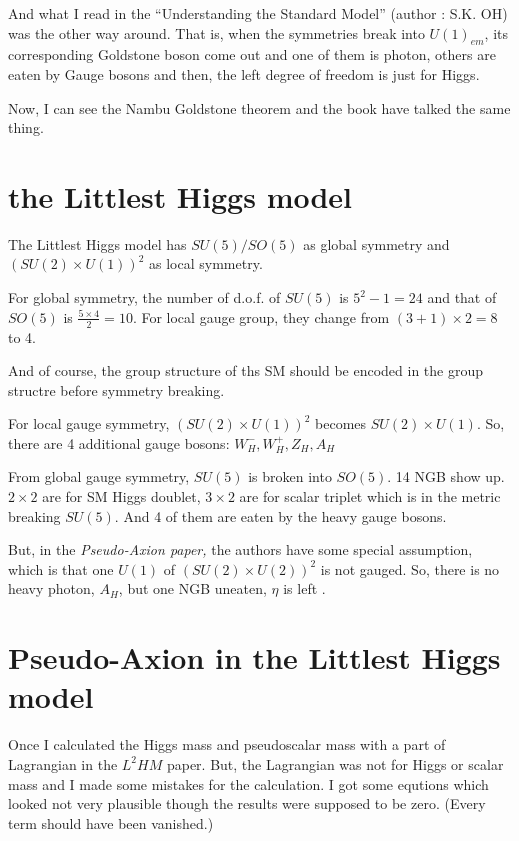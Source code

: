 \documentclass[aps,preprint,floatfix,nofootinbib,showpacs]{revtex4-1}
\begin{document}
And what I read in the ``Understanding the Standard Model'' 
(author : S.K. OH) was the other way around.
That is, when the symmetries break into $U(1)_{em}$, 
its corresponding Goldstone boson come out and 
one of them is photon, others are eaten by Gauge bosons and then, 
the left degree of freedom is just for Higgs.

Now, I can see the Nambu Goldstone theorem and the book have talked the same thing.




\newpage
\section{the Littlest Higgs model}
The Littlest Higgs model has $SU(5)/SO(5)$ as global symmetry and $(SU(2)\times U(1))^2$ 
as local symmetry.

For global symmetry, the number of d.o.f. of $SU(5)$ is $5^2 -1 = 24$ and 
that of $SO(5)$ is $\frac{5\times4}{2} = 10$. 
For local gauge group, they change from $(3+1)\times 2 = 8$ to 4. 

And of course, the group structure of ths SM should be encoded 
in the group structre before symmetry breaking.

For local gauge symmetry,  $(SU(2)\times U(1))^2$ becomes  $SU(2)\times U(1)$. 
So, there are 4 additional gauge bosons: $W_H^-, W_H^+, Z_H, A_H$

From global gauge symmetry, $SU(5)$ is broken into $SO(5)$. 14 NGB show up. 
$2\times2$ are for SM Higgs doublet, $3\times2$ 
are for scalar triplet which is in the metric breaking $SU(5)$.
And 4 of them are eaten by the heavy gauge bosons.

{\large{But, in the \it{Pseudo-Axion} paper,}} the authors have some special assumption,
which is that one $U(1)$ of $(SU(2) \times U(2))^2$ is not gauged. 
So, there is no heavy photon, $A_H$, but one NGB uneaten, $\eta$ is left .

\newpage
\section{Pseudo-Axion in the Littlest Higgs model}
Once I calculated the Higgs mass and pseudoscalar mass 
with a part of Lagrangian in the $L^2 HM$ paper. 
But, the Lagrangian was not for Higgs or scalar mass 
and I made some mistakes for the calculation.
I got some equtions which looked not very plausible 
though the results were supposed to be zero. 
(Every term should have been vanished.) 
\end{document}
